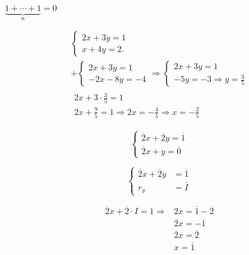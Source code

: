 $\underbrace{1+\cdots+1}_{n}=0$

\[
	\begin{array}{l}
		\left\{\begin{array}{l}
			2 x+3 y=1 \\
			x+4 y=2 .
		\end{array}\right.                                                      \\
		+\left\{\begin{array}{l}
			2 x+3 y=1 \\
			-2 x-8 y=-4
		\end{array} \Rightarrow\left\{\begin{array}{l}
			2 x+3 y=1 \\
			-5 y=-3 \Rightarrow y=\frac{3}{5}
		\end{array}\right.\right. \\
		\begin{array}{l}
			2 x+3 \cdot \frac{3}{5}=1 \\
			2 x+\frac{9}{5}=1 \Rightarrow 2 x=-\frac{4}{5} \Rightarrow x=-\frac{2}{5}
		\end{array}
	\end{array}
\]

\[
	\left\{\begin{array}{l}
		\overline{2} x+\overline{2} y=\overline{1} \\
		\overline{2} x+y=\overline{0}
	\end{array}\right.
\]

\[
	\left\{\begin{aligned}
		\overline{2} x+\overline{2} y & =\overline{1} \\
		r_{y}                         & =\bar{I}
	\end{aligned}\right.
\]

\[
	\begin{aligned}
		\overline{2} x+\overline{2} \cdot I=1 \Rightarrow & 2 x=\overline{1}-\overline{2} \\
		                                                  & \overline{2} x=-\overline{1}  \\
		                                                  & \overline{2} x=\overline{2}   \\
		                                                  & x=\overline{1}
	\end{aligned}
\]
